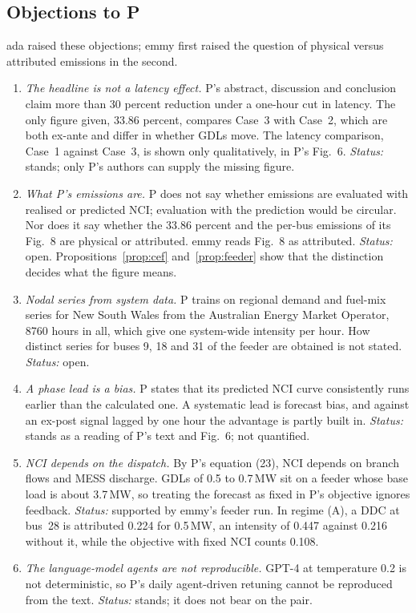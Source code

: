 \documentclass{article}
\begin{document}
\subsection{Objections to P}

ada raised these objections; emmy first raised the question of physical versus attributed emissions in the second.
\begin{enumerate}
\item \emph{The headline is not a latency effect.} P's abstract, discussion and conclusion claim more than 30 percent reduction under a one-hour cut in latency. The only figure given, 33.86 percent, compares Case~3 with Case~2, which are both ex-ante and differ in whether GDLs move. The latency comparison, Case~1 against Case~3, is shown only qualitatively, in P's Fig.~6. \emph{Status:} stands; only P's authors can supply the missing figure.
\item \emph{What P's emissions are.} P does not say whether emissions are evaluated with realised or predicted NCI; evaluation with the prediction would be circular. Nor does it say whether the 33.86 percent and the per-bus emissions of its Fig.~8 are physical or attributed. emmy reads Fig.~8 as attributed. \emph{Status:} open. Propositions~\ref{prop:cef} and~\ref{prop:feeder} show that the distinction decides what the figure means.
\item \emph{Nodal series from system data.} P trains on regional demand and fuel-mix series for New South Wales from the Australian Energy Market Operator, 8760 hours in all, which give one system-wide intensity per hour. How distinct series for buses 9, 18 and 31 of the feeder are obtained is not stated. \emph{Status:} open.
\item \emph{A phase lead is a bias.} P states that its predicted NCI curve consistently runs earlier than the calculated one. A systematic lead is forecast bias, and against an ex-post signal lagged by one hour the advantage is partly built in. \emph{Status:} stands as a reading of P's text and Fig.~6; not quantified.
\item \emph{NCI depends on the dispatch.} By P's equation (23), NCI depends on branch flows and MESS discharge. GDLs of 0.5 to 0.7\,MW sit on a feeder whose base load is about 3.7\,MW, so treating the forecast as fixed in P's objective ignores feedback. \emph{Status:} supported by emmy's feeder run. In regime (A), a DDC at bus~28 is attributed 0.224 for 0.5\,MW, an intensity of 0.447 against 0.216 without it, while the objective with fixed NCI counts 0.108.
\item \emph{The language-model agents are not reproducible.} GPT-4 at temperature 0.2 is not deterministic, so P's daily agent-driven retuning cannot be reproduced from the text. \emph{Status:} stands; it does not bear on the pair.

\end{enumerate}
\end{document}
